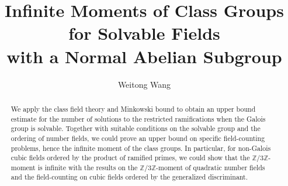 \documentclass[12pt,a4paper]{amsart}
\numberwithin{equation}{section}%
\theoremstyle{plain}%
\theoremstyle{definition}%
\theoremstyle{remark}%
\begin{document}
	\title[Infinite Moments of Class Groups]{Infinite Moments of Class Groups for Solvable Fields \\ with a Normal Abelian Subgroup}%
	\date{}%
	\author{Weitong Wang}%
	\address{College of Mathematical Sciences, Shaw Hall of Harbin Engineering University, No. 145, Nantong Street, Nangang District, Harbin, Heilongjiang Province 150001 China}%
\begin{abstract}
	We apply the class field theory and Minkowski bound to obtain an upper bound estimate for the number of solutions to the restricted ramifications when the Galois group is solvable.
	Together with suitable conditions on the solvable group and the ordering of number fields, we could prove an upper bound on specific field-counting problems, hence the infinite moment of the class groups.
	In particular, for non-Galois cubic fields ordered by the product of ramified primes, we could show that the $\mathbb{Z}/3\mathbb{Z}$-moment is infinite with the results on the $\mathbb{Z}/3\mathbb{Z}$-moment of quadratic number fields and the field-counting on cubic fields ordered by the generalized discriminant.
\end{abstract}	
	\maketitle
	\tableofcontents
\end{document}
